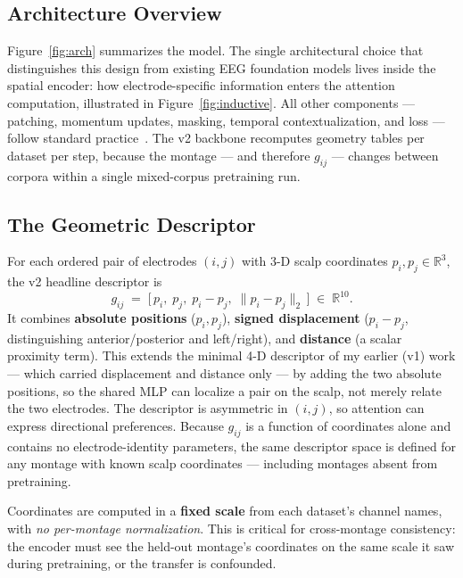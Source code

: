 \documentclass[11pt]{article}
\begin{document}
\subsection{Architecture Overview}
\label{sec:solution:overview}

Figure~\ref{fig:arch} summarizes the model. The single architectural choice
that distinguishes this design from existing EEG foundation models lives
inside the spatial encoder: how electrode-specific information enters the
attention computation, illustrated in Figure~\ref{fig:inductive}. All other
components --- patching, momentum updates, masking, temporal
contextualization, and loss --- follow standard
practice~\cite{grill2020byol, he2022mae, wang2024eegpt}. The v2 backbone
recomputes geometry tables per dataset per step, because the montage --- and
therefore $g_{ij}$ --- changes between corpora within a single mixed-corpus
pretraining run.



\subsection{The Geometric Descriptor}
\label{sec:solution:geometry}

For each ordered pair of electrodes $(i,j)$ with 3-D scalp coordinates
$p_i, p_j \in \mathbb{R}^3$, the v2 headline descriptor is
\begin{equation}
  g_{ij} \;=\; \bigl[\,p_i,\; p_j,\; p_i - p_j,\; \|p_i - p_j\|_2\,\bigr]
        \;\in\; \mathbb{R}^{10}.
  \label{eq:geo_desc}
\end{equation}
It combines \textbf{absolute positions} ($p_i, p_j$), \textbf{signed
displacement} ($p_i - p_j$, distinguishing anterior/posterior and
left/right), and \textbf{distance} (a scalar proximity term). This extends
the minimal 4-D descriptor of my earlier (v1) work --- which carried
displacement and distance only --- by adding the two absolute positions, so
the shared MLP can localize a pair on the scalp, not merely relate the two
electrodes. The descriptor is asymmetric in $(i, j)$, so attention can
express directional preferences. Because $g_{ij}$ is a function of
coordinates alone and contains no electrode-identity parameters, the same
descriptor space is defined for any montage with known scalp coordinates ---
including montages absent from pretraining.

Coordinates are computed in a \textbf{fixed scale} from each dataset's
channel names, with \emph{no per-montage normalization}. This is critical for
cross-montage consistency: the encoder must see the held-out montage's
coordinates on the same scale it saw during pretraining, or the transfer is
confounded.
\end{document}

